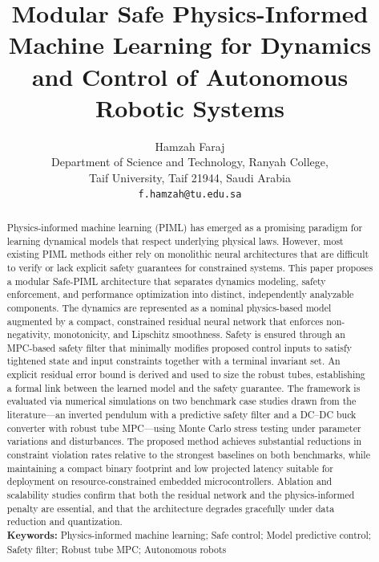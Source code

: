\documentclass[12pt,a4paper]{article}
\begin{document}
\title{Modular Safe Physics-Informed Machine Learning for Dynamics and Control of Autonomous Robotic Systems}

\author{Hamzah Faraj\\[3pt]
  \small Department of Science and Technology, Ranyah College,\\[-1pt]
  \small Taif University, Taif 21944, Saudi Arabia\\[-1pt]
  \small \texttt{f.hamzah@tu.edu.sa}}

\date{}
\maketitle

\begin{abstract}
\noindent
Physics-informed machine learning (PIML) has emerged as a promising
paradigm for learning dynamical models that respect underlying physical
laws. However, most existing PIML methods either rely on monolithic
neural architectures that are difficult to verify or lack explicit
safety guarantees for constrained systems. This paper proposes a
modular Safe-PIML architecture that separates dynamics modeling,
safety enforcement, and performance optimization into distinct,
independently analyzable components. The dynamics are represented as a
nominal physics-based model augmented by a compact, constrained
residual neural network that enforces non-negativity, monotonicity, and
Lipschitz smoothness. Safety is ensured through an MPC-based safety
filter that minimally modifies proposed control inputs to satisfy
tightened state and input constraints together with a terminal invariant
set. An explicit residual error bound is derived and used to size the
robust tubes, establishing a formal link between the learned model and
the safety guarantee. The framework is evaluated via numerical
simulations on two benchmark case studies drawn from the
literature---an inverted pendulum with a predictive safety filter and a
DC--DC buck converter with robust tube MPC---using Monte Carlo stress
testing under parameter variations and disturbances. The proposed method
achieves substantial reductions in constraint violation rates relative
to the strongest baselines on both benchmarks, while maintaining a
compact binary footprint and low projected latency suitable for
deployment on resource-constrained embedded microcontrollers. Ablation
and scalability studies confirm that both the residual network and the
physics-informed penalty are essential, and that the architecture
degrades gracefully under data reduction and quantization.\\[6pt]
\textbf{Keywords:} Physics-informed machine learning; Safe control;
Model predictive control; Safety filter; Robust tube MPC;
Autonomous robots
\end{abstract}
\end{document}
